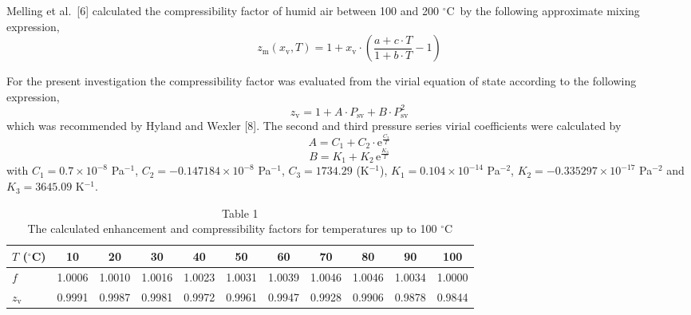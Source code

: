 \documentclass[11pt]{article}
\newcommand{\degC}{$^{\circ}$C}
\newcommand{\Psv}{P_\mathrm{sv}}
\begin{document}
\noindent Melling et al.\ [6] calculated the compressibility factor of
humid air between 100 and 200 \degC\ by the following approximate
mixing expression,
\begin{equation}
z_\mathrm{m}(x_\mathrm{v},T) = 1 + x_\mathrm{v}
  \cdot\left(\frac{a+c\cdot T}{1+b\cdot T}-1\right)
\end{equation}

\noindent For the present investigation the compressibility factor was
evaluated from the virial equation of state according to the following
expression,
\begin{equation}
z_\mathrm{v} = 1 + A\cdot \Psv + B\cdot \Psv^{2}
\end{equation}
which was recommended by Hyland and Wexler [8]. The second and third
pressure series virial coefficients were calculated by
\begin{equation}
A = C_1 + C_2\cdot \mathrm{e}^{\frac{C_3}{T}}
\end{equation}
\begin{equation}
B = K_1 + K_2\,\mathrm{e}^{\frac{K_3}{T}}
\end{equation}
with
$C_1 = 0.7\times10^{-8}$ Pa$^{-1}$,
$C_2 = -0.147184\times10^{-8}$ Pa$^{-1}$,
$C_3 = 1734.29$ (K$^{-1}$),
$K_1 = 0.104\times10^{-14}$ Pa$^{-2}$,
$K_2 = -0.335297\times10^{-17}$ Pa$^{-2}$ and
$K_3 = 3645.09$ K$^{-1}$.


\begin{table}[htbp]
\centering
\footnotesize
\caption*{Table 1\\ The calculated enhancement and compressibility
          factors for temperatures up to 100 \degC}
\setlength{\tabcolsep}{5pt}
\begin{tabular}{lcccccccccc}
\toprule
$T$ (\degC) & 10 & 20 & 30 & 40 & 50 & 60 & 70 & 80 & 90 & 100 \\
\midrule
$f$            & 1.0006 & 1.0010 & 1.0016 & 1.0023 & 1.0031
               & 1.0039 & 1.0046 & 1.0046 & 1.0034 & 1.0000 \\
$z_\mathrm{v}$ & 0.9991 & 0.9987 & 0.9981 & 0.9972 & 0.9961
               & 0.9947 & 0.9928 & 0.9906 & 0.9878 & 0.9844 \\
\bottomrule
\end{tabular}
\end{table}
\end{document}
